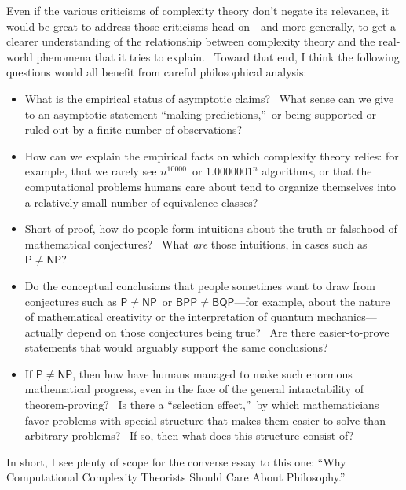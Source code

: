 \documentclass[12pt,onecolumn]{article}%
\begin{document}
Even if the various criticisms of complexity theory don't negate its
relevance, it would be great to address those criticisms head-on---and more
generally, to get a clearer understanding of the relationship between
complexity theory and the real-world phenomena that it tries to explain.
\ Toward that end, I think the following questions would all benefit from
careful philosophical analysis:

\begin{itemize}
\item What is the empirical status of asymptotic claims? \ What sense can we
give to an asymptotic statement \textquotedblleft making
predictions,\textquotedblright\ or being supported or ruled out by a finite
number of observations?

\item How can we explain the empirical facts on which complexity theory
relies: for example, that we rarely see $n^{10000}$\ or $1.0000001^{n}$
algorithms, or that the computational problems humans care about tend to
organize themselves into a relatively-small number of equivalence classes?

\item Short of proof, how do people form intuitions about the truth or
falsehood of mathematical conjectures? \ What \textit{are} those intuitions,
in cases such as $\mathsf{P}\neq\mathsf{NP}$?

\item Do the conceptual conclusions that people sometimes want to draw from
conjectures such as $\mathsf{P}\neq\mathsf{NP}$\ or $\mathsf{BPP}%
\neq\mathsf{BQP}$---for example, about the nature of mathematical creativity
or the interpretation of quantum mechanics---actually depend on those
conjectures being true? \ Are there easier-to-prove statements that would
arguably support the same conclusions?

\item If $\mathsf{P}\neq\mathsf{NP}$, then how have humans managed to make
such enormous mathematical progress, even in the face of the general
intractability of theorem-proving? \ Is there a \textquotedblleft selection
effect,\textquotedblright\ by which mathematicians favor problems with special
structure that makes them easier to solve than arbitrary problems? \ If so,
then what does this structure consist of?
\end{itemize}

In short, I see plenty of scope for the converse essay to this one:
\textquotedblleft Why Computational Complexity Theorists Should Care About
Philosophy.\textquotedblright
\end{document}
